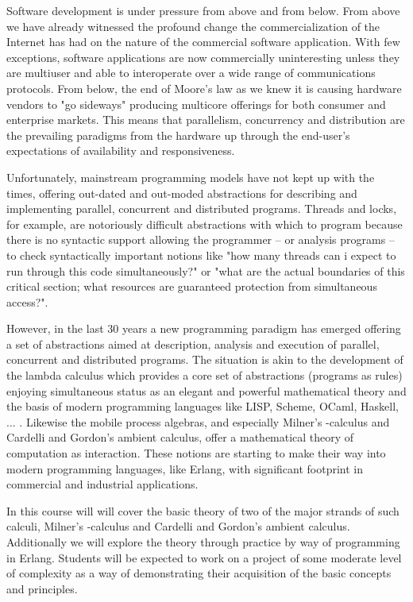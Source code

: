 Software development is under pressure from above and from below. From
above we have already witnessed the profound change the
commercialization of the Internet has had on the nature of the
commercial software application. With few exceptions, software
applications are now commercially uninteresting unless they are
multiuser and able to interoperate over a wide range of communications
protocols. From below, the end of Moore's law as we knew it is causing
hardware vendors to "go sideways" producing multicore offerings for
both consumer and enterprise markets. This means that parallelism,
concurrency and distribution are the prevailing paradigms from the
hardware up through the end-user's expectations of availability and
responsiveness.

Unfortunately, mainstream programming models have not kept up with the
times, offering out-dated and out-moded abstractions for describing
and implementing parallel, concurrent and distributed
programs. Threads and locks, for example, are notoriously difficult
abstractions with which to program because there is no syntactic
support allowing the programmer -- or analysis programs -- to check
syntactically important notions like "how many threads can i expect to
run through this code simultaneously?" or "what are the actual
boundaries of this critical section; what resources are guaranteed
protection from simultaneous access?".

However, in the last 30 years a new programming paradigm has emerged
offering a set of abstractions aimed at description, analysis and
execution of parallel, concurrent and distributed programs. The
situation is akin to the development of the lambda calculus which
provides a core set of abstractions (programs as rules) enjoying
simultaneous status as an elegant and powerful mathematical theory and
the basis of modern programming languages like LISP, Scheme, OCaml,
Haskell, ... . Likewise the mobile process algebras, and especially
Milner's \pi-calculus and Cardelli and Gordon's ambient calculus,
offer a mathematical theory of computation as interaction. These
notions are starting to make their way into modern programming
languages, like Erlang, with significant footprint in commercial and
industrial applications.

In this course will will cover the basic theory of two of the major
strands of such calculi, Milner's \pi-calculus and Cardelli and
Gordon's ambient calculus. Additionally we will explore the theory
through practice by way of programming in Erlang. Students will be
expected to work on a project of some moderate level of complexity as
a way of demonstrating their acquisition of the basic concepts and
principles.


